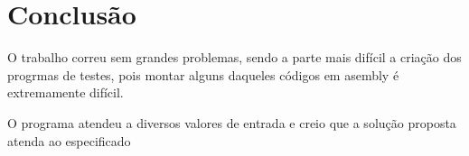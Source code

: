 \documentclass[12pt]{article}
\begin{document}
\section{Conclusão}
\label{conclusao}
O trabalho correu sem grandes problemas, sendo a parte mais difícil a criação
dos progrmas de testes, pois montar alguns daqueles códigos em asembly é
extremamente difícil.

O programa atendeu a diversos valores de entrada e creio que a solução proposta
atenda ao especificado
\end{document}
